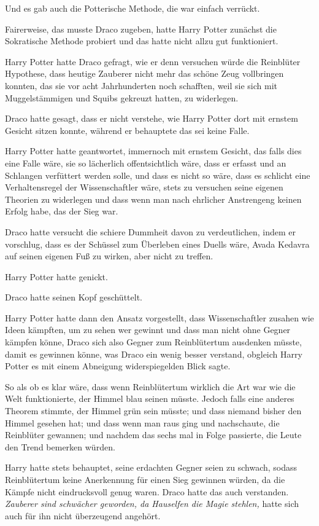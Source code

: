 {Und es gab auch die Potterische Methode, die war einfach verrückt.

Fairerweise, das musste Draco zugeben, hatte Harry Potter zunächst die Sokratische Methode probiert und das hatte nicht allzu gut funktioniert.

Harry Potter hatte Draco gefragt, wie er denn versuchen würde die Reinblüter Hypothese, dass heutige Zauberer nicht mehr das schöne Zeug vollbringen konnten, das sie vor acht Jahrhunderten noch schafften, weil sie sich mit Muggelstämmigen und Squibs gekreuzt hatten, zu widerlegen.

Draco hatte gesagt, dass er nicht verstehe, wie Harry Potter dort mit ernstem Gesicht sitzen konnte, während er behauptete das sei keine Falle.

Harry Potter hatte geantwortet, immernoch mit ernstem Gesicht, das falls dies eine Falle wäre, sie so lächerlich offentsichtlich wäre, dass er erfasst und an Schlangen verfüttert werden solle, und dass es nicht so wäre, dass es schlicht eine Verhaltensregel der Wissenschaftler wäre, stets zu versuchen seine eigenen Theorien zu widerlegen und dass wenn man nach ehrlicher Anstrengeng keinen Erfolg habe, das der Sieg war.

Draco hatte versucht die schiere Dummheit davon zu verdeutlichen, indem er vorschlug, dass es der Schüssel zum Überleben eines Duells wäre, Avada Kedavra auf seinen eigenen Fuß zu wirken, aber nicht zu treffen.

Harry Potter hatte genickt.

Draco hatte seinen Kopf geschüttelt.

Harry Potter hatte dann den Ansatz vorgestellt, dass Wissenschaftler zusahen wie Ideen kämpften, um zu sehen wer gewinnt und dass man nicht ohne Gegner kämpfen könne, Draco sich also Gegner zum Reinblütertum ausdenken müsste, damit es gewinnen könne, was Draco ein wenig besser verstand, obgleich Harry Potter es mit einem Abneigung widerspiegelden Blick sagte.

So als ob es klar wäre, dass wenn Reinblütertum wirklich die Art war wie die Welt funktionierte, der Himmel blau seinen müsste. Jedoch falls eine anderes Theorem stimmte, der Himmel grün sein müsste; und dass niemand bisher den Himmel gesehen hat; und dass wenn man raus ging und nachschaute, die Reinblüter gewannen; und nachdem das sechs mal in Folge passierte, die Leute den Trend bemerken würden.

Harry hatte stets behauptet, seine erdachten Gegner seien zu schwach, sodass Reinblütertum keine Anerkennung für einen Sieg gewinnen würden, da die Kämpfe nicht eindrucksvoll genug waren. Draco hatte das auch verstanden. \emph{Zauberer sind schwächer geworden, da Hauselfen die Magie stehlen,} hatte sich auch für ihn nicht überzeugend angehört.

}
